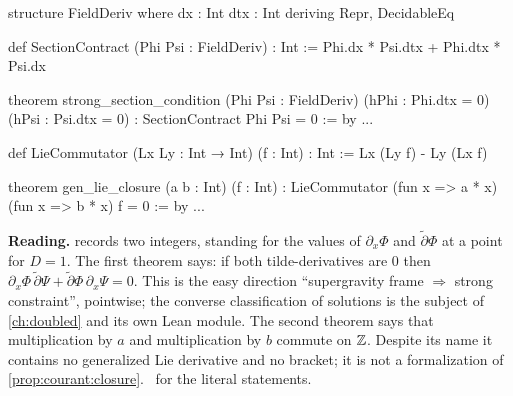 \begin{leanbox}
\begin{leancode}
structure FieldDeriv where
  dx : Int
  dtx : Int
deriving Repr, DecidableEq

def SectionContract (Phi Psi : FieldDeriv) : Int :=
  Phi.dx * Psi.dtx + Phi.dtx * Psi.dx

theorem strong_section_condition (Phi Psi : FieldDeriv)
    (hPhi : Phi.dtx = 0) (hPsi : Psi.dtx = 0) :
    SectionContract Phi Psi = 0 := by ...

def LieCommutator (Lx Ly : Int → Int) (f : Int) : Int :=
  Lx (Ly f) - Ly (Lx f)

theorem gen_lie_closure (a b : Int) (f : Int) :
    LieCommutator (fun x => a * x) (fun x => b * x) f = 0 := by ...
\end{leancode}
\textbf{Reading.}  records two integers, standing for the values of
$\partial_x\Phi$ and $\tilde\partial\Phi$ at a point for $D=1$. The first theorem says: if both
tilde-derivatives are $0$ then $\partial_x\Phi\,\tilde\partial\Psi+\tilde\partial\Phi\,
\partial_x\Psi=0$. This is the easy direction ``supergravity frame $\Rightarrow$ strong
constraint'', pointwise; the converse classification of solutions is the subject of
\cref{ch:doubled} and its own Lean module. The second theorem says that multiplication by $a$ and
multiplication by $b$ commute on $\mathbb{Z}$. Despite its name it contains no generalized Lie
derivative and no bracket; it is not a formalization of \cref{prop:courant:closure}. \TA\ for the
literal statements.
\end{leanbox}

